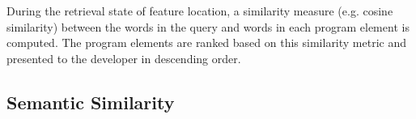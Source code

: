 During the retrieval state of feature location, a similarity measure
(e.g. cosine similarity) between the words in the query and words in
each program element is computed. The program elements are ranked
based on this similarity metric and presented to the developer in
descending order.







\subsection{Semantic Similarity}
